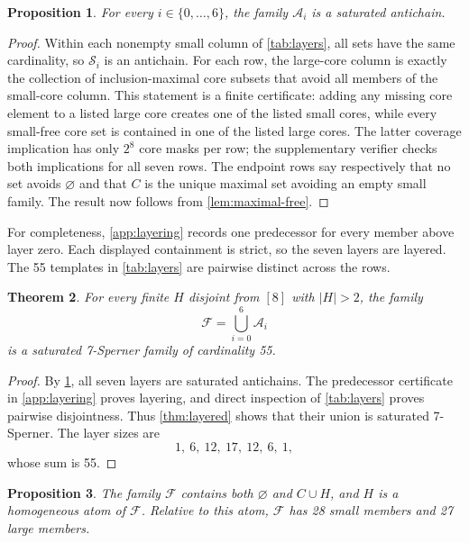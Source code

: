 \documentclass[11pt]{article}
\newtheorem{theorem}{Theorem}[section]
\newtheorem{proposition}[theorem]{Proposition}
\theoremstyle{definition}
\theoremstyle{remark}
\newcommand{\family}{\mathcal{F}}
\newcommand{\smallcores}{\mathcal{S}}
\begin{document}
\begin{proposition}
\label{prop:layer-certificate}
For every $i\in\{0,\ldots,6\}$, the family $\mathcal A_i$ is a saturated
antichain.
\end{proposition}

\begin{proof}
Within each nonempty small column of \cref{tab:layers}, all sets have the same
cardinality, so $\smallcores_i$ is an antichain.  For each row, the large-core
column is exactly the collection of inclusion-maximal core subsets that avoid
all members of the small-core column.  This statement is a finite certificate:
adding any missing core element to a listed large core creates one of the
listed small cores, while every small-free core set is contained in one of the
listed large cores.  The latter coverage implication has only $2^8$ core
masks per row; the supplementary verifier checks both implications for all
seven rows.  The endpoint rows say respectively that no set avoids
$\varnothing$ and that $C$ is the unique maximal set avoiding an empty small
family.  The result now follows from \cref{lem:maximal-free}.
\end{proof}

For completeness, \cref{app:layering} records one predecessor for every member
above layer zero.  Each displayed containment is strict, so the seven layers
are layered.  The 55 templates in \cref{tab:layers} are pairwise distinct
across the rows.

\begin{theorem}
\label{thm:size55}
For every finite $H$ disjoint from $[8]$ with $|H|>2$, the family
\[
  \family=\bigcup_{i=0}^{6}\mathcal A_i
\]
is a saturated 7-Sperner family of cardinality 55.
\end{theorem}

\begin{proof}
By \cref{prop:layer-certificate}, all seven layers are saturated antichains.
The predecessor certificate in \cref{app:layering} proves layering, and direct
inspection of \cref{tab:layers} proves pairwise disjointness.  Thus
\cref{thm:layered} shows that their union is saturated 7-Sperner.  The layer
sizes are
\[
  1,\ 6,\ 12,\ 17,\ 12,\ 6,\ 1,
\]
whose sum is 55.
\end{proof}

\begin{proposition}
\label{prop:endpoints-atom}
The family $\family$ contains both $\varnothing$ and $C\cup H$, and $H$ is a
homogeneous atom of $\family$.  Relative to this atom, $\family$ has 28 small
members and 27 large members.
\end{proposition}
\end{document}
